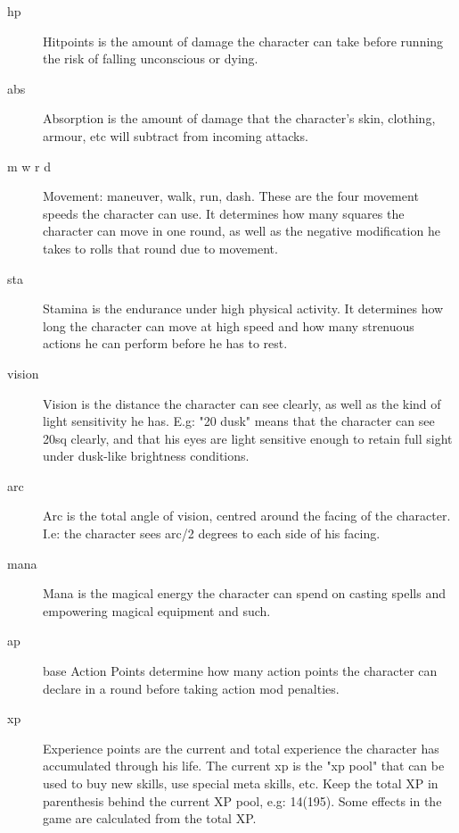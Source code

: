 \begin{description}

\item[hp] Hitpoints is the amount of damage the character can take before running the risk of falling unconscious or dying.

\item[abs] Absorption is the amount of damage that the character's skin, clothing, armour, etc will subtract from incoming attacks.

\item[m w r d] Movement: maneuver, walk, run, dash. These are the four movement speeds the character can use. It determines how many squares the character can move in one round, as well as the negative modification he takes to rolls that round due to movement.

\item[sta] Stamina is the endurance under high physical activity. It determines how long the character can move at high speed and how many strenuous actions he can perform before he has to rest.

\item[vision] Vision is the distance the character can see clearly, as well as the kind of light sensitivity he has. E.g: "20 dusk" means that the character can see 20sq clearly, and that his eyes are light sensitive enough to retain full sight under dusk-like brightness conditions.

\item[arc] Arc is the total angle of vision, centred around the facing of the character. I.e: the character sees arc/2 degrees to each side of his facing.

\item[mana] Mana is the magical energy the character can spend on casting spells and empowering magical equipment and such.

\item[ap] base Action Points determine how many action points the character can declare in a round before taking action mod penalties.

\item[xp] Experience points are the current and total experience the character has accumulated through his life. The current xp is the "xp pool" that can be used to buy new skills, use special meta skills, etc. Keep the total XP in parenthesis behind the current XP pool, e.g: 14(195). Some effects in the game are calculated from the total XP.

\end{description}

